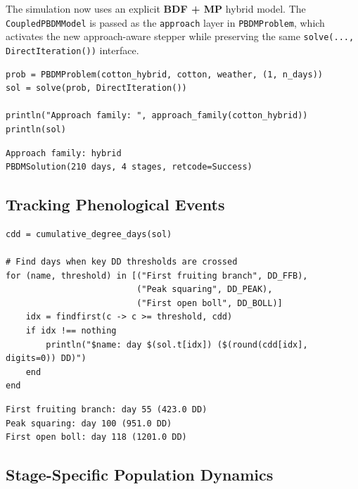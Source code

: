 \label{18319201786906891826}{}


The simulation now uses an explicit \textbf{BDF + MP} hybrid model. The \texttt{CoupledPBDMModel} is passed as the \texttt{approach} layer in \texttt{PBDMProblem}, which activates the new approach-aware stepper while preserving the same \texttt{solve(..., DirectIteration())} interface.




\begin{verbatim}
prob = PBDMProblem(cotton_hybrid, cotton, weather, (1, n_days))
sol = solve(prob, DirectIteration())

println("Approach family: ", approach_family(cotton_hybrid))
println(sol)
\end{verbatim}




\begin{verbatim}
Approach family: hybrid
PBDMSolution(210 days, 4 stages, retcode=Success)
\end{verbatim}



\subsection{Tracking Phenological Events}



\label{16006218755237166338}{}



\begin{verbatim}
cdd = cumulative_degree_days(sol)

# Find days when key DD thresholds are crossed
for (name, threshold) in [("First fruiting branch", DD_FFB),
                          ("Peak squaring", DD_PEAK),
                          ("First open boll", DD_BOLL)]
    idx = findfirst(c -> c >= threshold, cdd)
    if idx !== nothing
        println("$name: day $(sol.t[idx]) ($(round(cdd[idx], digits=0)) DD)")
    end
end
\end{verbatim}




\begin{verbatim}
First fruiting branch: day 55 (423.0 DD)
Peak squaring: day 100 (951.0 DD)
First open boll: day 118 (1201.0 DD)
\end{verbatim}



\subsection{Stage-Specific Population Dynamics}



